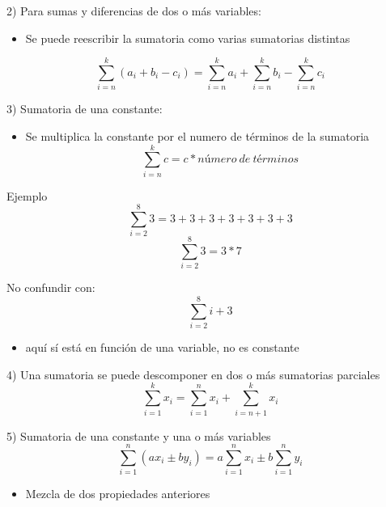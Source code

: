\documentclass[presentation]{beamer}
\begin{document}
\begin{frame}[label=sec-4]{2) Para sumas y diferencias de dos o más variables:}
\begin{itemize}
\item Se puede reescribir la sumatoria como varias sumatorias distintas
\end{itemize}


\[\sum_{i=n}^{k}(a_{i} + b_{i} - c_{i}) = \sum_{i=n}^{k}a_{i} + \sum_{i=n}^{k} b_{i} - \sum_{i=n}^{k} c_{i} \] 
\end{frame}


\begin{frame}[label=sec-5]{3) Sumatoria de una constante:}
\begin{itemize}
\item Se multiplica la constante por el numero de términos de la sumatoria
\[\sum_{i=n}^{k} c = c * número\ de\ términos \]
\end{itemize}
\end{frame}

\begin{frame}[label=sec-6]{Ejemplo}
\[\sum_{i=2}^{8} 3 = 3 + 3 + 3 + 3 + 3 + 3 + 3\] 
\[\sum_{i=2}^{8} 3 = 3 * 7 \] 

No confundir con: 
 \[\sum_{i=2}^{8} i + 3  \]

\begin{itemize}
\item aquí sí está en función de una variable, no es constante
\end{itemize}
\end{frame}

\begin{frame}[label=sec-7]{4) Una sumatoria se puede descomponer en dos o más sumatorias parciales}
\[\sum_{i=1}^{k}x_{i} = \sum_{i=1}^{n}x_{i} + \sum_{i=n+1}^{k} x_{i} \] 
\end{frame}

\begin{frame}[label=sec-8]{5) Sumatoria de una constante y una o más variables}
\[\sum_{i=1}^{n}(ax_{i} \pm by_{i}) = a\sum_{i=1}^{n}x_{i} \pm b\sum_{i=1}^{n} y_{i} \]

\begin{itemize}
\item Mezcla de dos propiedades anteriores
\end{itemize}
\end{frame}
\end{document}
